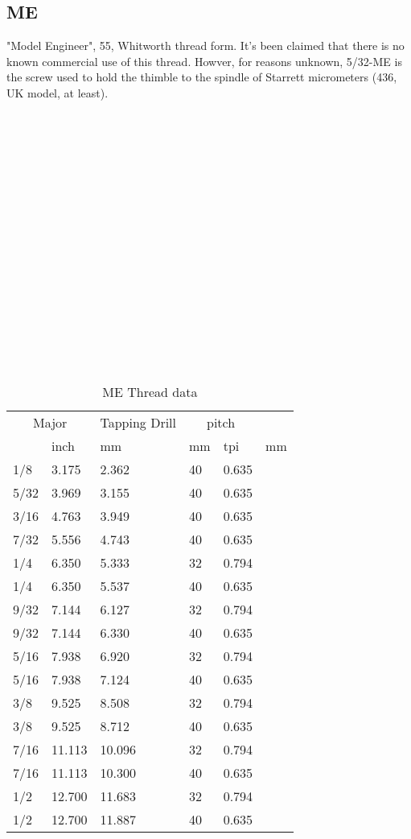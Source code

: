 \subsection{ME}
"Model Engineer", 55\degree, Whitworth thread form.  It's been claimed that there is no known commercial use of this thread. Howver, for reasons unknown, 5/32-ME is the screw used to hold the thimble to the spindle of Starrett micrometers (436, UK model, at least).
\\ \\ \\ \\ \\ \\ \\ \\ \\ \\ \\ \\ \\ \\ \\ \\ \\ \\
\begin{table}[h!]
    \footnotesize
\begin{longtable}{ll|ll|ll}
    \multicolumn{2}{c}{Major}
    &Tapping Drill
    &\multicolumn{2}{c}{pitch}
    \\
    &inch
    &mm

    &mm

    &tpi
    &mm
    \\
\hline
1/8  & 3.175 & 2.362  &40 &0.635\\
5/32 & 3.969 & 3.155  &40 &0.635\\
3/16 & 4.763 & 3.949  &40 &0.635\\
7/32 & 5.556 & 4.743  &40 &0.635\\
1/4  & 6.350 & 5.333  &32 &0.794\\
1/4  & 6.350 & 5.537  &40 &0.635\\
9/32 & 7.144 & 6.127  &32 &0.794\\
9/32 & 7.144 & 6.330  &40 &0.635\\
5/16 & 7.938 & 6.920  &32 &0.794\\
5/16 & 7.938 & 7.124  &40 &0.635\\
3/8  & 9.525 & 8.508  &32 &0.794\\
3/8  & 9.525 & 8.712  &40 &0.635\\
7/16 &11.113 &10.096  &32 &0.794\\
7/16 &11.113 &10.300  &40 &0.635\\
1/2  &12.700 &11.683  &32 &0.794\\
1/2  &12.700 &11.887  &40 &0.635\\
\end{longtable}
\caption{ME Thread data}
\end{table}
\clearpage
